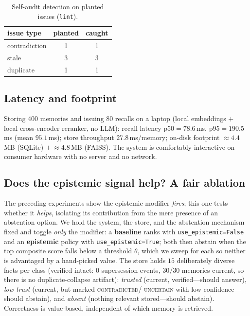 \documentclass[11pt]{article}
\theoremstyle{definition}
\newcommand{\status}[1]{\textsc{#1}}
\newcommand{\code}[1]{\texttt{#1}}
\begin{document}
\begin{table}[h]
\centering\small
\caption{Self-audit detection on planted issues (\code{lint}).}
\label{tab:lint}
\begin{tabular}{lcc}
\toprule
issue type & planted & caught \\
\midrule
contradiction & 1 & 1 \\
stale         & 3 & 3 \\
duplicate     & 1 & 1 \\
\bottomrule
\end{tabular}
\end{table}

\subsection{Latency and footprint}\label{sec:exp-latency}
Storing $400$ memories and issuing $80$ recalls on a laptop (local embeddings
$+$ local cross-encoder reranker, no LLM): recall latency
$\text{p50}=78.6$\,ms, $\text{p95}=190.5$\,ms (mean $95.1$\,ms); store
throughput $27.8$\,ms/memory; on-disk footprint ${\approx}4.4$\,MB (SQLite)
$+\,{\approx}4.8$\,MB (FAISS). The system is comfortably interactive on consumer
hardware with no server and no network.

\subsection{Does the epistemic signal help? A fair ablation}\label{sec:exp-fair}
The preceding experiments show the epistemic modifier \emph{fires}; this one
tests whether it \emph{helps}, isolating its contribution from the mere presence
of an abstention option. We hold the system, the store, and the abstention
mechanism fixed and toggle \emph{only} the modifier: a \textbf{baseline} ranks
with \code{use\_epistemic=False} and an \textbf{epistemic} policy with
\code{use\_epistemic=True}; both then abstain when the top composite score falls
below a threshold $\theta$, which we sweep for each so neither is advantaged by a
hand-picked value. The store holds $15$ deliberately diverse facts per class
(verified intact: $0$ supersession events, $30/30$ memories current, so there is
no duplicate-collapse artifact): \emph{trusted} (current, verified---should
answer), \emph{low-trust} (current, but marked \status{contradicted}/
\status{uncertain} with low confidence---should abstain), and \emph{absent}
(nothing relevant stored---should abstain). Correctness is value-based,
independent of which memory is retrieved.
\end{document}
